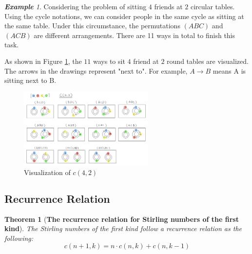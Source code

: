 \documentclass{article}
\newtheorem{theorem}{Theorem}[section]
\theoremstyle{definition}
\theoremstyle{remark}
\theoremstyle{example}
\newtheorem{example}{\textbf{Example}}[section]
\begin{document}
\begin{example} \label{ex:c(4,2)}
Considering the problem of sitting $4$ friends at $2$ circular tables. Using the cycle notations, we can consider people in the same cycle as sitting at the same table. Under this circumstance, the permutations $(ABC)$ and $(ACB)$ are different arrangements. There are 11 ways in total to finish this task.

As shown in Figure \ref{vis:V1}, the $11$ ways to sit $4$ friend at $2$ round tables are visualized. The arrows in the drawings represent "next to". For example, $A \rightarrow B$ means A is sitting next to B.

\begin{figure}[H]
\centering
\includegraphics[width=0.6\textwidth]{Visualization1.jpeg}
\caption{\label{vis:V1}Visualization of $c(4,2)$}
\end{figure}
\end{example}

\subsection{Recurrence Relation}\label{sec:4.2}
\begin{theorem}[\textbf{The recurrence relation for Stirling numbers of the first kind}]\label{thm:RR1st}
    The Stirling numbers of the first kind follow a recurrence relation as the following:
    \begin{equation}\label{eqn:RR1st}
        c(n+1,k) = n\cdot c(n,k) + c(n,k-1)
    \end{equation}
\end{theorem}
\end{document}
